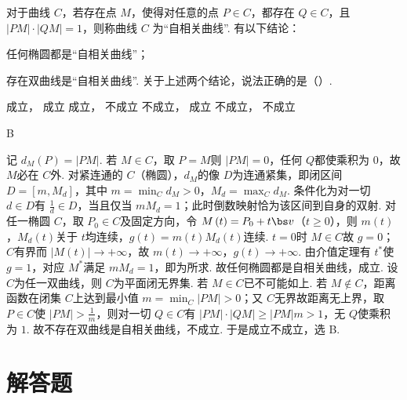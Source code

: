 \begin{problem}
对于曲线 \(C\)，若存在点 \(M\)，使得对任意的点 \(P\in C\)，都存在 \(Q\in C\)，且 \(\left|PM\right|\cdot\left|QM\right|=1\)，则称曲线 \(C\) 为“自相关曲线”. 有以下结论：
\begin{circlelist}
\item 任何椭圆都是“自相关曲线”；
\item 存在双曲线是“自相关曲线”. 关于上述两个结论，说法正确的是（\quad）.
\end{circlelist}

\choices
    { 成立， 成立}
    { 成立， 不成立}
    { 不成立， 成立}
    { 不成立， 不成立}
\end{problem}

\begin{answer}
B
\end{answer}

\begin{solution}
记 \(d_{M}\left(P\right)=\left|PM\right|\). 若 \(M\in C\)，取 \(P=M\)则 \(\left|PM\right|=0\)，任何 \(Q\)都使乘积为 \(0\)，故 \(M\)必在 \(C\)外. 对紧连通的 \(C\)（椭圆），\(d_{M}\)的像 \(D\)为连通紧集，即闭区间 \(D=\left[m,M_{d}\right]\)，其中 \(m=\min_{C}d_{M}>0\)，\(M_{d}=\max_{C}d_{M}\). 条件化为对一切 \(d\in D\)有 \(\frac1d\in D\)，当且仅当 \(mM_{d}=1\)；此时倒数映射恰为该区间到自身的双射. 对任一椭圆 \(C\)，取 \(P_{0}\in C\)及固定方向，令 \(M\left(t\right)=P_{0}+t\bs v\)（\(t\ge 0\)），则 \(m\left(t\right)\)，\(M_{d}\left(t\right)\)关于 \(t\)均连续，\(g\left(t\right)=m\left(t\right)M_{d}\left(t\right)\)连续. \(t=0\)时 \(M\in C\)故 \(g=0\)；\(C\)有界而 \(\left|M\left(t\right)\right|\to+\infty\)，故 \(m\left(t\right)\to+\infty\)，\(g\left(t\right)\to+\infty\). 由介值定理有 \(t^{\ast}\)使 \(g=1\)，对应 \(M^{\ast}\)满足 \(mM_{d}=1\)，即为所求. 故任何椭圆都是自相关曲线，成立. 设 \(C\)为任一双曲线，则 \(C\)为平面闭无界集. 若 \(M\in C\)已不可能如上. 若 \(M\notin C\)，距离函数在闭集 \(C\)上达到最小值 \(m=\min_{C}\left|PM\right|>0\)；又 \(C\)无界故距离无上界，取 \(P\in C\)使 \(\left|PM\right|>\frac1m\)，则对一切 \(Q\in C\)有 \(\left|PM\right|\cdot\left|QM\right|\ge\left|PM\right|m>1\)，无 \(Q\)使乘积为 \(1\). 故不存在双曲线是自相关曲线，不成立. 于是成立不成立，选 B.
\end{solution}

\section{解答题}

